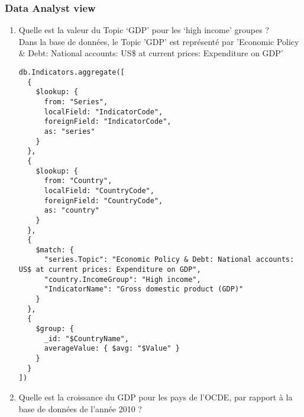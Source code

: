 \subsubsection{Data Analyst view}
\begin{enumerate}
    \item Quelle est la valeur du Topic ‘GDP’ pour les ‘high income’ groupes ?\\
    
Dans la base de données, le Topic 'GDP' est représenté par 'Economic Policy & Debt: National accounts: US\$ at current prices: Expenditure on GDP'
\begin{lstlisting}
db.Indicators.aggregate([
  {
    $lookup: {
      from: "Series",
      localField: "IndicatorCode",
      foreignField: "IndicatorCode",
      as: "series"
    }
  },
  {
    $lookup: {
      from: "Country",
      localField: "CountryCode",
      foreignField: "CountryCode",
      as: "country"
    }
  },
  {
    $match: {
      "series.Topic": "Economic Policy & Debt: National accounts: US$ at current prices: Expenditure on GDP",
      "country.IncomeGroup": "High income",
      "IndicatorName": "Gross domestic product (GDP)"
    }
  },
  {
    $group: {
      _id: "$CountryName",
      averageValue: { $avg: "$Value" }
    }
  }
])

\end{lstlisting}
    \item Quelle est la croissance du GDP pour les pays de l’OCDE, par rapport à la base de données
    de l’année 2010 ?\\


\end{enumerate}

